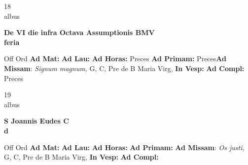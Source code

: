 \documentclass[10pt, openany]{book}
\begin{document}
    \begin{center}
        \begin{minipage}{3.5in}
            \vspace{2em}
            \begin{minipage}{0.5in}
                {\Huge 18} \\
                {\normalsize albus}
            \end{minipage}
            \begin{minipage}{3.0in}
                \textbf{ \large De VI die infra Octava Assumptionis BMV \\
                \textnormal{\normalsize feria}}

            \end{minipage}
            \begin{justify}Off Ord
                \textbf{Ad Mat: }
                \textbf{Ad Lau: }
                \textbf{Ad Horas: }Preces
                \textbf{Ad Primam: }Preces\textbf{Ad Missam}: \textit{Signum magnum,} G, C, Pre de B Maria Virg, 
                \textbf{In Vesp: }
                \textbf{Ad Compl: }Preces
            \end{justify}
        \end{minipage}
    \end{center}

    \begin{center}
        \begin{minipage}{3.5in}
            \vspace{2em}
            \begin{minipage}{0.5in}
                {\Huge 19} \\
                {\normalsize albus}
            \end{minipage}
            \begin{minipage}{3.0in}
                \textbf{ \large S Joannis Eudes C \\
                \textnormal{\normalsize d}}

            \end{minipage}
            \begin{justify}Off Ord
                \textbf{Ad Mat: }
                \textbf{Ad Lau: }
                \textbf{Ad Horas: }
                \textbf{Ad Primam: }\textbf{Ad Missam}: \textit{Os justi,} G, C, Pre de B Maria Virg, 
                \textbf{In Vesp: }
                \textbf{Ad Compl: }
            \end{justify}
        \end{minipage}
    \end{center}
\end{document}
